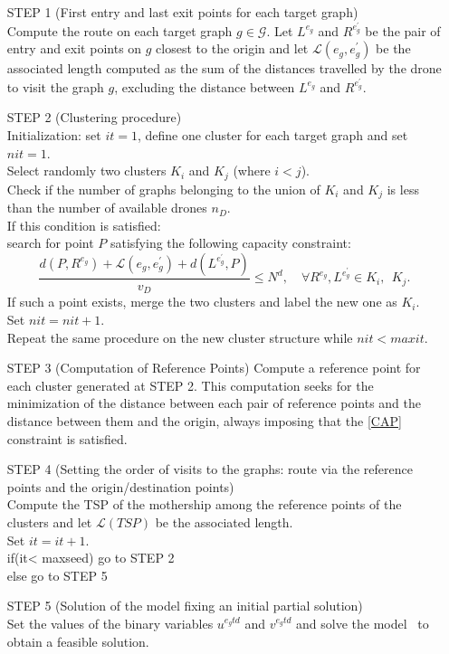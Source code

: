 \begin{itemize} 
\item[STEP 1] (First entry and last exit points for each target graph)\\
Compute the route on each target graph $g \in \mathcal{G}$.
Let $L^{e_{g}}$ and $R^{e^{'}_{g}}$ be the pair of entry and exit points on $g$ closest to the origin and let  $\mathcal L(e_{g}, e^{'}_{g})$ be the associated length computed as the sum of the distances travelled by the drone to visit the graph $g$, excluding the distance between $L^{e_{g}}$ and $R^{e^{'}_{g}}$.
\item[STEP 2] (Clustering procedure)\\
Initialization: set $it=1$, define one cluster for each target graph and set $nit=1$. \\
Select randomly two clusters $K_i$ and $K_j$ (where $i<j$).\\
Check if the number of graphs belonging to the union of $K_i$ and $K_j$ is less than the number of available drones $n_D$.\\
If this condition is satisfied:\\
search for point $P$ satisfying the following capacity constraint:
$$
\frac{d(P, R^{e_g}) + \mathcal L(e_{g}, e^{'}_{g}) + d(L^{e^{'}_{g}}, P)}{v_D} \leq N^d, \quad \forall R^{e_g}, L^{e^{'}_{g}} \in K_i, \:\: K_j.
$$
If such a point exists, merge the two clusters and label the new one as $K_i$.\\
Set $nit=nit+1$.\\
Repeat the same procedure on the new cluster structure while $nit < maxit$.
\item[STEP 3] (Computation of Reference Points) 
Compute a reference point for each cluster generated at STEP 2. This computation seeks for the minimization of the distance between each pair of reference points and the distance between them and the origin, always imposing that the \eqref{CAP} constraint is satisfied.



\item [STEP 4] (Setting the order of visits to the  graphs: route via the reference points and the origin/destination points) \\
Compute the TSP of the mothership among the reference points of the clusters and let $\mathcal L(TSP)$ be the associated length.\\
Set $it=it+1$.\\
if(it< maxseed) go to STEP 2\\
else go to STEP 5
\item [STEP 5] (Solution of the \AMD\space model fixing an initial partial solution)\\
Set the values of the binary variables $u^{e_{g}td}$ and $v^{e_{g}td}$ and solve the model \AMD\, to obtain a feasible solution.
\end{itemize}
